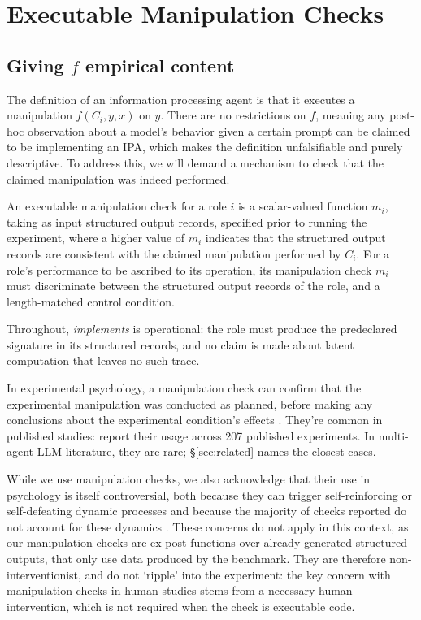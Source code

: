 \section{Executable Manipulation Checks}
\label{sec:method}

\subsection{Giving \texorpdfstring{$f$}{f} empirical content}
\label{sec:empirical-content}

The definition of an information processing agent is that it executes a manipulation
$f(C_i, y, x)$ on $y$. There are no restrictions on $f$, meaning any post-hoc observation about a
model's behavior given a certain prompt can be claimed to be implementing an IPA, which makes the
definition unfalsifiable and purely descriptive. To address this, we will demand a mechanism to
check that the claimed manipulation was indeed performed.

\begin{definition}
\label{def:check}
An executable manipulation check for a role $i$ is a scalar-valued function $m_i$, taking as input
structured output records, specified prior to running the experiment, where a higher value of $m_i$
indicates that the structured output records are consistent with the claimed manipulation performed
by $C_i$. For a role's performance to be ascribed to its operation, its manipulation check $m_i$
must discriminate between the structured output records of the role, and a length-matched control
condition.
\end{definition}

Throughout, \emph{implements} is operational: the role must produce the predeclared signature in its
structured records, and no claim is made about latent computation that leaves no such trace.

In experimental psychology, a manipulation check can confirm that the experimental manipulation was
conducted as planned, before making any conclusions about the experimental condition's effects
\citep{ejelov2020manipulation}. They're common in published studies: \citet{ejelov2020manipulation}
report their usage across 207 published experiments. In multi-agent LLM literature, they are rare;
\S\ref{sec:related} names the closest cases.

While we use manipulation checks, we also acknowledge that their use in psychology is itself
controversial, both because they can trigger self-reinforcing or self-defeating dynamic processes
\citep{hauser2018necessary} and because the majority of checks reported do not account for these
dynamics \citep{ejelov2020manipulation}. These concerns do not apply in this context, as our
manipulation checks are ex-post functions over already generated structured outputs, that only use
data produced by the benchmark. They are therefore non-interventionist, and do not `ripple' into the
experiment: the key concern with manipulation checks in human studies stems from a necessary human
intervention, which is not required when the check is executable code.


